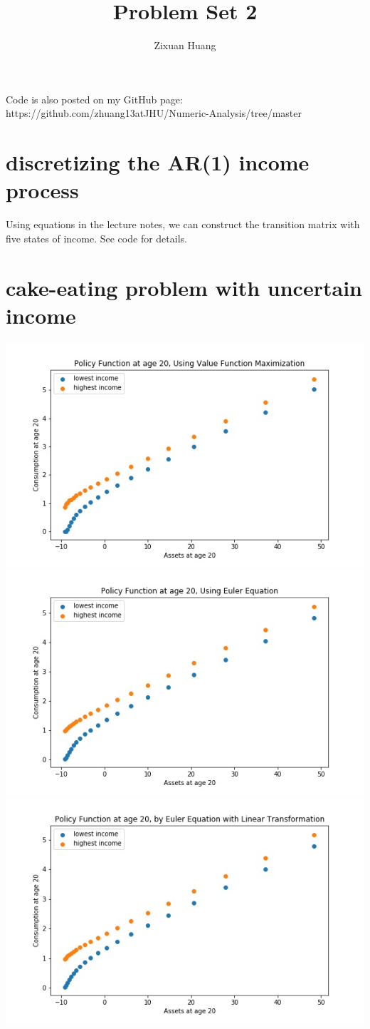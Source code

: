 \documentclass[]{article}
\title{Problem Set 2}
\author{Zixuan Huang}
\begin{document}
\maketitle
Code is also posted on my GitHub page: https://github.com/zhuang13atJHU/Numeric-Analysis/tree/master  
\section{discretizing the AR(1) income process}
Using equations in the lecture notes, we can construct the transition matrix with five states of income. See code for details. 
\section{cake-eating problem with uncertain income}
\includegraphics[width=\linewidth]{value func.jpg}
\includegraphics[width=\linewidth]{Euler no trans.jpg}
\includegraphics[width=\linewidth]{Euler.jpg}
\end{document}
